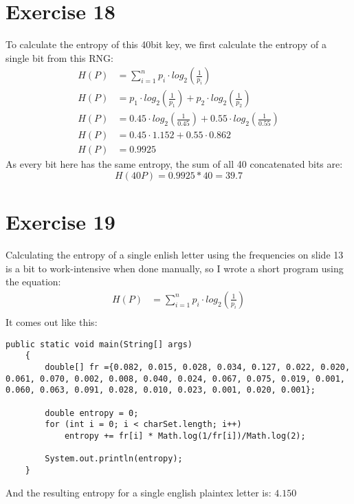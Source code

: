 \section*{Exercise 18}
To calculate the entropy of this 40bit key, we first calculate the entropy of a
single bit from this RNG:
\begin{equation*}
\begin{split}
H(P) &= \displaystyle\sum_{i=1}^{n} p_i \cdot log_2\left(\frac{1}{p_i}\right)\\
H(P) &= p_1 \cdot log_2\left(\frac{1}{p_1}\right) + p_2 \cdot
		log_2\left(\frac{1}{p_2}\right)\\
H(P) &= 0.45 \cdot log_2 \left(\frac{1}{0.45}\right) + 0.55 \cdot
		log_2\left(\frac{1}{0.55}\right)\\
H(P) &= 0.45 \cdot 1.152 + 0.55 \cdot 0.862\\
H(P) &= 0.9925
\end{split}
\end{equation*}
As every bit here has the same entropy, the sum of all 40 concatenated bits are:
\begin{equation*}
H(40P) = 0.9925 * 40 =  39.7
\end{equation*}
\section*{Exercise 19}
Calculating the entropy of a single enlish letter using the frequencies on
slide 13 is a bit to work-intensive when done manually, so I wrote a short
program using the equation:
\begin{equation*}
\begin{split}
H(P) &= \displaystyle\sum_{i=1}^{n} p_i \cdot log_2\left(\frac{1}{p_i}\right)\\
\end{split}
\end{equation*}
It comes out like this:
\begin{lstlisting}
public static void main(String[] args)
	{
		double[] fr ={0.082, 0.015, 0.028, 0.034, 0.127, 0.022, 0.020, 0.061, 0.070, 0.002, 0.008, 0.040, 0.024, 0.067, 0.075, 0.019, 0.001, 0.060, 0.063, 0.091, 0.028, 0.010, 0.023, 0.001, 0.020, 0.001};
				
		double entropy = 0;
		for (int i = 0; i < charSet.length; i++)
			entropy += fr[i] * Math.log(1/fr[i])/Math.log(2);
		
		System.out.println(entropy);
	}
\end{lstlisting}

And the resulting entropy for a single english plaintex letter is:
$4.150$
